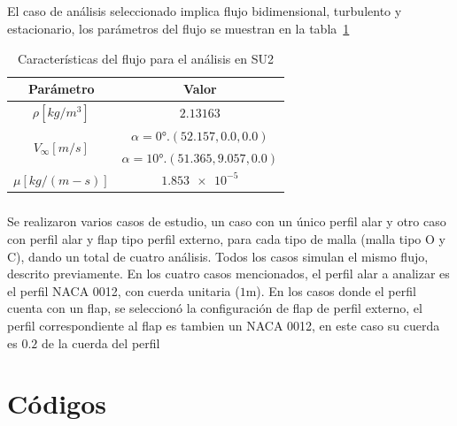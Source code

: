 \documentclass[letterpaper, openright, 12pt]{book}
\begin{document}
    \paragraph*{}
    El caso de análisis seleccionado implica flujo bidimensional, turbulento y
    estacionario, los parámetros del flujo se muestran en la
    tabla~\ref{SU2_simulation}
    \begin{table}[htbp!]
    \begin{center}
        \begin{tabular}{| c | c |}
        \hline
        Parámetro & Valor\\
        \hline
        $\rho[kg / m^3]$ &  $2.13163$\\
        \hline
        \multirow{2}{*}{$V_{\infty}[m / s]$} & $\alpha = \ang{0}.
        (52.157, 0.0, 0.0)$\\
        & $\alpha = \ang{10}. (51.365, 9.057, 0.0)$\\
        \hline
        $\mu[kg / (m-s)]$ &  $\num{1.853e-5}$\\
        \hline
        \end{tabular}
        \caption{Características del flujo para el análisis en SU2}
        \label{SU2_simulation}
    \end{center}
    \end{table}

    \paragraph*{}
    Se realizaron varios casos de estudio, un caso con un único perfil alar y
    otro caso con perfil alar y flap tipo perfil externo, para cada tipo de
    malla (malla tipo O y C), dando un total de cuatro análisis. Todos los
    casos simulan el mismo flujo, descrito previamente. En los cuatro casos
    mencionados, el perfil alar a analizar es el perfil NACA 0012, con cuerda
    unitaria ($1$m). En los casos donde el perfil cuenta con un flap, se
    seleccionó la configuración de flap de perfil externo, el perfil
    correspondiente al flap es tambien un NACA 0012, en este caso su cuerda es
    $0.2$ de la cuerda del perfil


%
%
%
%
%

%
%
%
%
%
\appendix
\chapter{Códigos}\label{appCode}

%
%
%
%
%
\end{document}
